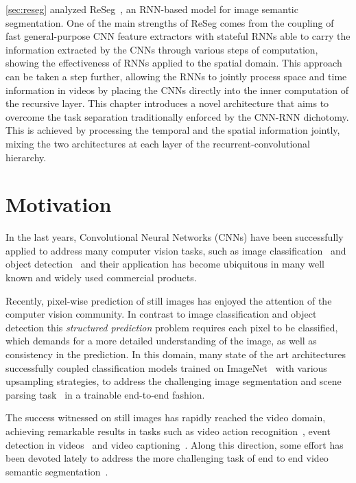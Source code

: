 \autoref{sec:reseg} analyzed ReSeg~\citep{Visin_2016_CVPR_Workshops}, an
RNN-based model for image semantic segmentation. One of the main strengths of
ReSeg comes from the coupling of fast general-purpose CNN feature extractors
with stateful RNNs able to carry the information extracted by the CNNs through
various steps of computation, showing the effectiveness of RNNs applied to the
spatial domain. This approach can be taken a step further, allowing the RNNs
to jointly process space and time information in videos by placing the CNNs
directly into the inner computation of the recursive layer. This chapter
introduces a novel architecture that aims to overcome the task separation
traditionally enforced by the CNN-RNN dichotomy. This is achieved by processing
the temporal and the spatial information jointly, mixing the two architectures
at each layer of the recurrent-convolutional hierarchy.


\section{Motivation}

In the last years, Convolutional Neural Networks (CNNs) have been successfully
applied to address many computer vision tasks, such as image
classification~\citep{Krizhevsky2012-alexnet,Simonyan2015,
Szegedy-et-al-arxiv2014} and object detection~\citep{Girshick-et-al-arxiv2013,
Sermanet13overfeat} and their application has become ubiquitous in many well
known and widely used commercial products.

Recently, pixel-wise prediction of still images has enjoyed the attention
of the computer vision community. In contrast to image classification and
object detection this \emph{structured prediction} problem requires each
pixel to be classified, which demands for a more detailed understanding of
the image, as well as consistency in the prediction. In this domain, many
state of the art architectures successfully coupled classification models
trained on ImageNet~\citep{Simonyan14vgg,Szegedy15googlelenet} with various
upsampling strategies, to address the challenging image segmentation and scene
parsing task~\citep[see e.g.,~][]{long2014fully,noh2015learning} in a trainable
end-to-end fashion.

The success witnessed on still images has rapidly reached the video domain,
achieving remarkable results in tasks such as video action recognition~\citep{
simonyan2014two,karpathy2014large}, event detection in videos~\citep{
yeung2015end} and video captioning~\citep{yao2015describing}. Along this
direction, some effort has been devoted lately to address the more
challenging task of end to end video semantic segmentation~\citep{Tran16v2v}.

